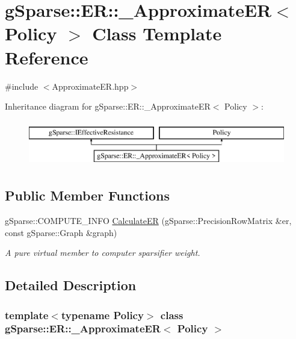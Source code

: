 \hypertarget{classg_sparse_1_1_e_r_1_1___approximate_e_r}{}\section{g\+Sparse\+:\+:ER\+:\+:\+\_\+\+Approximate\+ER$<$ Policy $>$ Class Template Reference}
\label{classg_sparse_1_1_e_r_1_1___approximate_e_r}


{\ttfamily \#include $<$Approximate\+E\+R.\+hpp$>$}

Inheritance diagram for g\+Sparse\+:\+:ER\+:\+:\+\_\+\+Approximate\+ER$<$ Policy $>$\+:\begin{figure}[H]
\begin{center}
\leavevmode
\includegraphics[height=2.000000cm]{classg_sparse_1_1_e_r_1_1___approximate_e_r}
\end{center}
\end{figure}
\subsection*{Public Member Functions}
\begin{DoxyCompactItemize}
\item 
\mbox{\label{classg_sparse_1_1_e_r_1_1___approximate_e_r_abf16cea687d1129e1a13b4af0db44892}} 
g\+Sparse\+::\+C\+O\+M\+P\+U\+T\+E\+\_\+\+I\+N\+FO \mbox{\hyperlink{classg_sparse_1_1_e_r_1_1___approximate_e_r_abf16cea687d1129e1a13b4af0db44892}{Calculate\+ER}} (g\+Sparse\+::\+Precision\+Row\+Matrix \&er, const g\+Sparse\+::\+Graph \&graph)
\begin{DoxyCompactList}\small\item\em A pure virtual member to computer sparsifier weight. \end{DoxyCompactList}\end{DoxyCompactItemize}


\subsection{Detailed Description}
\subsubsection*{template$<$typename Policy$>$\newline
class g\+Sparse\+::\+E\+R\+::\+\_\+\+Approximate\+E\+R$<$ Policy $>$}

